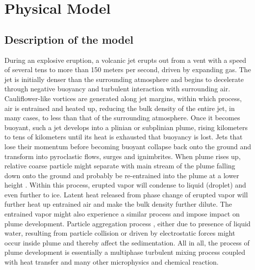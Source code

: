 \documentclass[journal abbreviation, manuscript]{copernicus}
\begin{document}
\section{Physical Model} \label{sec:physics-model}
\subsection{Description of the model}
During an explosive eruption, a volcanic jet erupts out from a vent with a speed of several tens to more than 150 meters per second, driven by expanding gas. The jet is initially denser than the surrounding atmosphere and begins to decelerate through negative buoyancy and turbulent interaction with surrounding air. Cauliflower-like vortices are generated along jet margins, within which process, air is entrained and heated up, reducing the bulk density of the entire jet, in many cases, to less than that of the surrounding atmosphere. Once it becomes buoyant, such a jet develops into a plinian or subplinian plume, rising kilometers to tens of kilometers until its heat is exhausted that buoyancy is lost. Jets that lose their momentum before becoming buoyant collapse back onto the ground and transform into pyroclastic flows, surges and ignimbrites. When plume rises up, relative coarse particle might separate with main stream of the plume falling down onto the ground and probably be re-entrained into the plume at a lower height \citep{ernst1996sedimentation}. Within this process, erupted vapor will condense to liquid (droplet) and even further to ice. Latent heat released from phase change of erupted vapor will further heat up entrained air and make the bulk density further dilute. The entrained vapor might also experience a similar process and impose impact on plume development. Particle aggregation process \citep{carey1982influence,taddeucci2011aggregation}, either due to presence of liquid water, resulting from particle collision or driven by electrostatic forces might occur inside plume and thereby affect the sedimentation. 
All in all, the process of plume development is  essentially a multiphase turbulent mixing process coupled with heat transfer and many other microphysics and chemical reaction.\\
\end{document}
